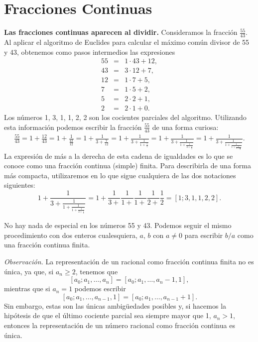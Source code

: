 \section{Fracciones Continuas}
\def\floor#1.{\lfloor #1\rfloor}

\noindent\textbf{Las fracciones continuas aparecen al dividir. } Consideramos la
fracci\'on $\frac{55}{43}$. Al aplicar el algoritmo de Euclides para calcular el
m\'aximo com\'un divisor de 55 y 43, obtenemos como pasos intermedios las
expresiones
$$
\begin{array}{rcl}
55&=&1\cdot 43+12,\\
43&=&3\cdot 12+7,\\
12&=&1\cdot 7+5,\\
7&=&1\cdot 5+2,\\
5&=&2\cdot 2+1,\\
2&=&2\cdot 1+0.
\end{array}
$$
Los n\'umeros 1, 3, 1, 1, 2, 2 son los cocientes parciales del algoritmo. 
Utilizando esta informaci\'on podemos escribir la fracci\'on $\frac{55}{43}$ de
una forma curiosa:
$$
\begin{array}{l}
\frac{55}{43}=1+\frac{12}{43}=1+\frac1{\frac{43}{12}}=1+\frac1{3+\frac7{12}}
=1+\frac1{3+\frac1{1+\frac57}}=1+\frac1{3+\frac1{1+\frac1{2+\frac25}}}
=1+\frac1{3+\frac1{1+\frac1{1+\frac1{2+\frac12}}}}.
\end{array}
$$
La expresi\'on de m\'as a la derecha de esta cadena de igualdades es lo que se
conoce como una fracci\'on continua (simple) finita. Para describirla de una
forma m\'as compacta, utilizaremos en lo que sigue cualquiera de las dos
notaciones siguientes:
$$
1+\frac1{3+\frac1{1+\frac1{1+\frac1{2+\frac12}}}}=1+\frac1{3+}\frac1{1+}\frac1{
1+}\frac1{2+}\frac12=[1;3,1,1,2,2].
$$

No hay nada de especial en los n\'umeros 55 y 43. Podemos seguir el mismo
procedimiento con dos enteros cualesquiera, $a$, $b$ con $a\ne0$ para escribir
$b/a$ como una fracci\'on continua finita.

\noindent\emph{Observaci\'on. }
La representaci\'on de un racional como fracci\'on continua finita no es
\'unica, ya que, si $a_n\ge2$, tenemos que
$$
[a_0;a_1,\dots,a_n]=[a_0;a_1,\dots, a_n-1,1],
$$
mientras que si $a_n=1$ podemos escribir
$$
[a_0;a_1,\dots,a_{n-1},1]=[a_0;a_1,\dots, a_{n-1}+1].
$$
Sin embargo, estas son las \'unicas ambig\"uedades posibles y, si hacemos la
hip\'otesis de que el \'ultimo cociente parcial sea siempre mayor que 1,
$a_n>1$, entonces la representaci\'on de un n\'umero racional como fracci\'on
continua es \'unica.


